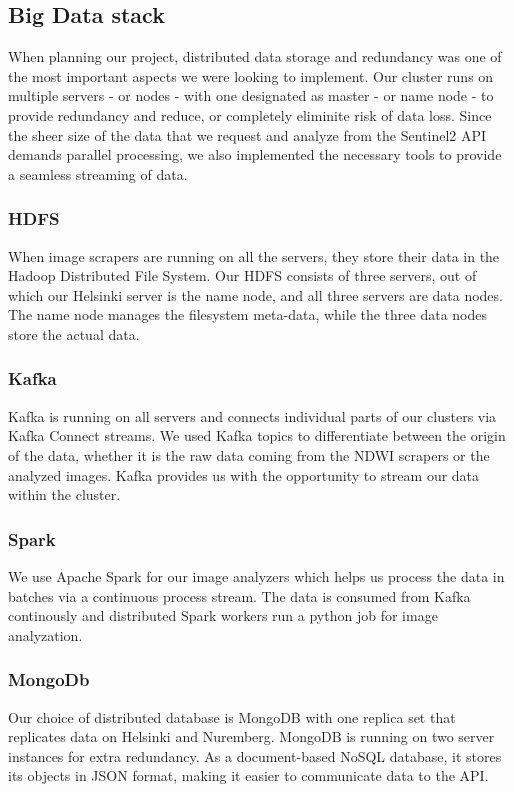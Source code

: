 \subsection{Big Data stack} \label{subsec:the-stack}
When planning our project, distributed data storage and redundancy was one of the most important aspects we were looking to implement.
Our cluster runs on multiple servers - or nodes - with one designated as master - or name node - to provide redundancy and reduce, or completely eliminite risk of data loss.
Since the sheer size of the data that we request and analyze from the Sentinel2 API demands parallel processing, we also implemented the necessary tools to provide a seamless streaming of data.


\subsubsection{HDFS}
When image scrapers are running on all the servers, they store their data in the Hadoop Distributed File System. Our HDFS consists of three servers, out of which our Helsinki server is the name node, and all three servers are data nodes.
The name node manages the filesystem meta-data, while the three data nodes store the actual data.

\subsubsection{Kafka}
Kafka is running on all servers and connects individual parts of our clusters via Kafka Connect streams. We used Kafka topics to differentiate between the origin of the data, whether it is the raw data coming from the NDWI scrapers or the analyzed images.
Kafka provides us with the opportunity to stream our data within the cluster.

\subsubsection{Spark}
We use Apache Spark for our image analyzers which helps us process the data in batches via a continuous process stream. The data is consumed from Kafka continously and distributed Spark workers run a python job for image analyzation.
\subsubsection{MongoDb}

Our choice of distributed database is MongoDB with one replica set that replicates data on Helsinki and Nuremberg. MongoDB is running on two server instances for extra redundancy. As a document-based NoSQL database, it stores its objects in JSON format, making it easier to communicate data to the API.

